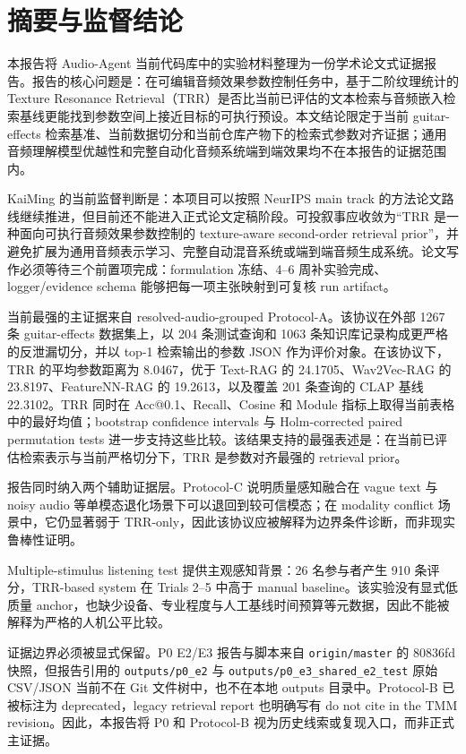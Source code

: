 \chapter{摘要与监督结论}

本报告将 Audio-Agent 当前代码库中的实验材料整理为一份学术论文式证据报告。报告的核心问题是：在可编辑音频效果参数控制任务中，基于二阶纹理统计的 Texture Resonance Retrieval（TRR）是否比当前已评估的文本检索与音频嵌入检索基线更能找到参数空间上接近目标的可执行预设。本文结论限定于当前 guitar-effects 检索基准、当前数据切分和当前仓库产物下的检索式参数对齐证据；通用音频理解模型优越性和完整自动化音频系统端到端效果均不在本报告的证据范围内。

KaiMing 的当前监督判断是：本项目可以按照 NeurIPS main track 的方法论文路线继续推进，但目前还不能进入正式论文定稿阶段。可投叙事应收敛为“TRR 是一种面向可执行音频效果参数控制的 texture-aware second-order retrieval prior”，并避免扩展为通用音频表示学习、完整自动混音系统或端到端音频生成系统。论文写作必须等待三个前置项完成：formulation 冻结、4--6 周补实验完成、logger/evidence schema 能够把每一项主张映射到可复核 run artifact。

当前最强的主证据来自 resolved-audio-grouped Protocol-A。该协议在外部 1267 条 guitar-effects 数据集上，以 204 条测试查询和 1063 条知识库记录构成更严格的反泄漏切分，并以 top-1 检索输出的参数 JSON 作为评价对象。在该协议下，TRR 的平均参数距离为 8.0467，优于 Text-RAG 的 24.1705、Wav2Vec-RAG 的 23.8197、FeatureNN-RAG 的 19.2613，以及覆盖 201 条查询的 CLAP 基线 22.3102。TRR 同时在 Acc@0.1、Recall、Cosine 和 Module 指标上取得当前表格中的最好均值；bootstrap confidence intervals 与 Holm-corrected paired permutation tests 进一步支持这些比较。该结果支持的最强表述是：在当前已评估检索表示与当前严格切分下，TRR 是参数对齐最强的 retrieval prior。

报告同时纳入两个辅助证据层。Protocol-C 说明质量感知融合在 vague text 与 noisy audio 等单模态退化场景下可以退回到较可信模态；在 modality conflict 场景中，它仍显著弱于 TRR-only，因此该协议应被解释为边界条件诊断，而非现实鲁棒性证明。

Multiple-stimulus listening test 提供主观感知背景：26 名参与者产生 910 条评分，TRR-based system 在 Trials 2--5 中高于 manual baseline。该实验没有显式低质量 anchor，也缺少设备、专业程度与人工基线时间预算等元数据，因此不能被解释为严格的人机公平比较。

证据边界必须被显式保留。P0 E2/E3 报告与脚本来自 \texttt{origin/master} 的 80836fd 快照，但报告引用的 \texttt{outputs/p0\_e2} 与 \texttt{outputs/p0\_e3\_shared\_e2\_test} 原始 CSV/JSON 当前不在 Git 文件树中，也不在本地 outputs 目录中。Protocol-B 已被标注为 deprecated，legacy retrieval report 也明确写有 do not cite in the TMM revision。因此，本报告将 P0 和 Protocol-B 视为历史线索或复现入口，而非正式主证据。

